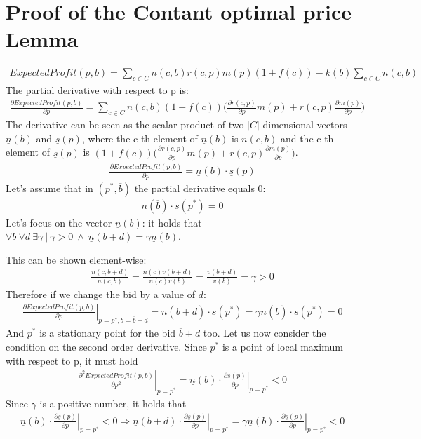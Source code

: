 \documentclass[11pt]{article} %
\begin{document}
\section{Proof of the Contant optimal price Lemma}\label{sec.ConstOptPrice}
\begin{align*}
ExpectedProfit(p,b)=\sum_{c \in C}{n(c,b)r(c,p)m(p)(1+f(c))}-k(b)\sum_{c \in C}{n(c,b)}
\end{align*}
The partial derivative with respect to p is:
\begin{align*}
\frac{\partial ExpectedProfit(p,b)}{\partial p}=\sum_{c \in C}{n(c,b)(1+f(c))\bigg(\frac{\partial r(c,p)}{\partial p}m(p) + r(c,p)\frac{\partial m(p)}{\partial p}\bigg)}
\end{align*}
The derivative can be seen as the scalar product of two $|C|$-dimensional vectors $\underline n(b)$ and $\underline s(p)$, where the c-th element of $\underline n(b)$ is $n(c,b)$ and the c-th element of $\underline s(p)$ is $(1+f(c))\bigg(\frac{\partial r(c,p)}{\partial p}m(p) + r(c,p)\frac{\partial m(p)}{\partial p}\bigg)$.
\begin{align*}
\frac{\partial ExpectedProfit(p,b)}{\partial p}=\underline n(b)\cdot \underline s(p)
\end{align*}
Let's assume that in $(p^*, \overline b)$ the partial derivative equals 0:
\begin{align*}
\underline n(\overline b)\cdot \underline s(p^*) = 0
\end{align*}
Let's focus on the vector $\underline n(b)$: it holds that $\forall b \ \forall d \ \exists \gamma \  | \ \gamma > 0\  \wedge \   \underline n(b + d)=\gamma\underline n(b)$.

This can be shown element-wise:
\begin{align*}
\frac{n(c, b+d)}{n(c,b)} = \frac{n(c)v(b+d)}{n(c)v(b)} = \frac{v(b+d)}{v(b)} = \gamma > 0
\end{align*}
Therefore if we change the bid by a value of $d$:
\begin{align*}
\left.\frac{\partial ExpectedProfit(p,b)}{\partial p}\right\rvert_{p=p^*, b=\overline b+d}=\underline n(\overline b+d)\cdot \underline s(p^*) = \gamma \underline n(\overline b)\cdot \underline s(p^*) = 0
\end{align*}
And $p^*$ is a stationary point for the bid $\overline b+d$ too.
\newline
\newline
Let us now consider the condition on the second order derivative. Since $p^*$ is a point of local maximum with respect to p, it must hold
\begin{align*}
\left. \frac{\partial^2 ExpectedProfit(p,b)}{\partial p^2}\right \rvert_{p=p^*}=\underline n(b)\cdot \left. \frac{\partial \underline s(p)}{\partial p}\right \rvert_{p=p^*} < 0
\end{align*}
Since $\gamma$ is a positive number, it holds that
\begin{align*}
\underline n(b)\cdot \left. \frac{\partial \underline s(p)}{\partial p}\right \rvert_{p=p^*} < 0 \Rightarrow \underline n(b+d)\cdot \left. \frac{\partial \underline s(p)}{\partial p}\right \rvert_{p=p^*}= \gamma \underline n(b)\cdot \left. \frac{\partial \underline s(p)}{\partial p}\right \rvert_{p=p^*} < 0 
\end{align*}
\end{document}
